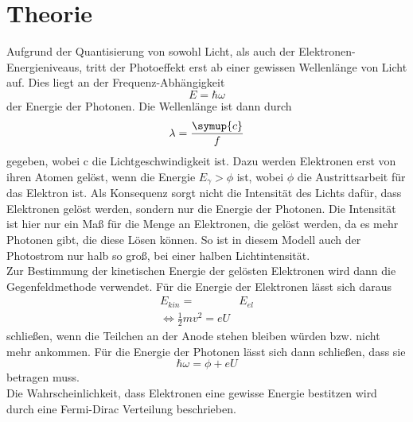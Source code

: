 \section{Theorie}
\label{sec:Theorie}

Aufgrund der Quantisierung von sowohl Licht, als auch der Elektronen-Energieniveaus, tritt der Photoeffekt
erst ab einer gewissen Wellenlänge von Licht auf. Dies liegt an der Frequenz-Abhängigkeit
\begin{equation}
    E=\hbar \omega
    \label{eqn:photon}
\end{equation}
\noindent der Energie der Photonen. 
Die Wellenlänge ist dann durch
\begin{equation}
    \lambda=\frac{\symup{c}}{f}
    \label{eqn:Frequenz}
\end{equation}
\noindent gegeben, wobei c die Lichtgeschwindigkeit ist.
Dazu werden Elektronen erst von ihren Atomen gelöst, wenn die Energie $E_\gamma > \phi$
ist, wobei $\phi$ die Austrittsarbeit für das Elektron ist. Als Konsequenz sorgt nicht die Intensität des Lichts dafür,
dass Elektronen gelöst werden, sondern nur die Energie der Photonen. Die Intensität ist hier nur ein Maß für die Menge
an Elektronen, die gelöst werden, da es mehr Photonen gibt, die diese Lösen können. So ist in diesem Modell auch
der Photostrom nur halb so groß, bei einer halben Lichtintensität.\\
Zur Bestimmung der kinetischen Energie der gelösten Elektronen wird dann die Gegenfeldmethode verwendet. Für die Energie 
der Elektronen lässt sich daraus
\begin{align}
    E_{kin}=&E_{el}\\
    \iff \frac{1}{2}mv^2=eU
    \label{eqn:ekin}
\end{align}
\noindent schließen, wenn die Teilchen an der Anode stehen bleiben würden bzw. nicht mehr ankommen.
Für die Energie der Photonen lässt sich dann schließen, dass sie
\begin{equation}
    \hbar \omega=\phi+eU
    \label{eqn:hquer}
\end{equation}
\noindent betragen muss. \\
\noindent Die Wahrscheinlichkeit, dass Elektronen eine gewisse Energie bestitzen wird durch eine Fermi-Dirac Verteilung beschrieben.
